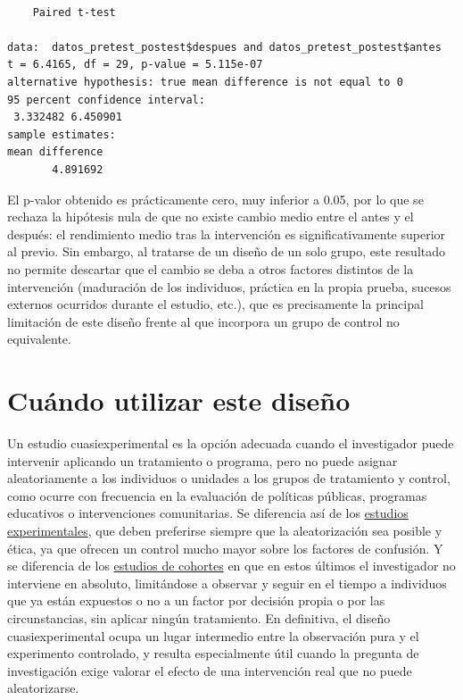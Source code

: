 \documentclass[
  spanish,
  a4paper,
]{scrreport}
\theoremstyle{definition}
\theoremstyle{definition}
\theoremstyle{remark}
\begin{document}
\begin{verbatim}

    Paired t-test

data:  datos_pretest_postest$despues and datos_pretest_postest$antes
t = 6.4165, df = 29, p-value = 5.115e-07
alternative hypothesis: true mean difference is not equal to 0
95 percent confidence interval:
 3.332482 6.450901
sample estimates:
mean difference 
       4.891692 
\end{verbatim}

El p-valor obtenido es prácticamente cero, muy inferior a 0.05, por lo
que se rechaza la hipótesis nula de que no existe cambio medio entre el
antes y el después: el rendimiento medio tras la intervención es
significativamente superior al previo. Sin embargo, al tratarse de un
diseño de un solo grupo, este resultado no permite descartar que el
cambio se deba a otros factores distintos de la intervención (maduración
de los individuos, práctica en la propia prueba, sucesos externos
ocurridos durante el estudio, etc.), que es precisamente la principal
limitación de este diseño frente al que incorpora un grupo de control no
equivalente.

\section{Cuándo utilizar este
diseño}\label{cuuxe1ndo-utilizar-este-diseuxf1o-6}

Un estudio cuasiexperimental es la opción adecuada cuando el
investigador puede intervenir aplicando un tratamiento o programa, pero
no puede asignar aleatoriamente a los individuos o unidades a los grupos
de tratamiento y control, como ocurre con frecuencia en la evaluación de
políticas públicas, programas educativos o intervenciones comunitarias.
Se diferencia así de los \hyperref[estudios-experimentales]{estudios
experimentales}, que deben preferirse siempre que la aleatorización sea
posible y ética, ya que ofrecen un control mucho mayor sobre los
factores de confusión. Y se diferencia de los
\hyperref[estudios-de-cohortes]{estudios de cohortes} en que en estos
últimos el investigador no interviene en absoluto, limitándose a
observar y seguir en el tiempo a individuos que ya están expuestos o no
a un factor por decisión propia o por las circunstancias, sin aplicar
ningún tratamiento. En definitiva, el diseño cuasiexperimental ocupa un
lugar intermedio entre la observación pura y el experimento controlado,
y resulta especialmente útil cuando la pregunta de investigación exige
valorar el efecto de una intervención real que no puede aleatorizarse.
\end{document}
